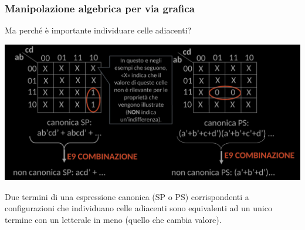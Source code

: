 \documentclass{article}
\begin{document}
\subsubsection{Manipolazione algebrica per via grafica}
Ma perché è importante individuare celle adiacenti?
\begin{center}
    \includegraphics[scale=0.48]{cellad2.png}
\end{center}
Due termini di una espressione canonica (SP o PS) corrispondenti a configurazioni che individuano celle adiacenti sono equivalenti ad un unico termine con un letterale in meno (quello che cambia valore).
\end{document}
